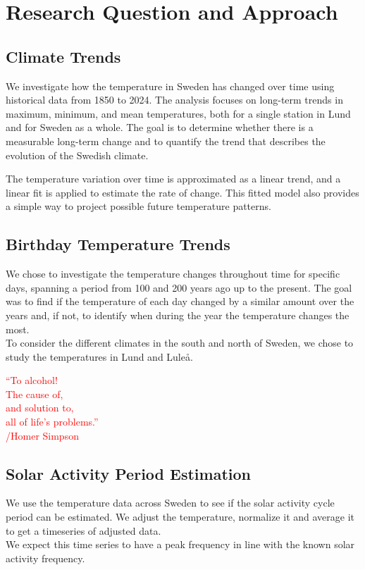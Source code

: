 \section{Research Question and Approach}

\subsection{Climate Trends}

We investigate how the temperature in Sweden has changed over time using historical data from 1850 to 2024. The analysis focuses on long-term trends in maximum, minimum, and mean temperatures, both for a single station in Lund and for Sweden as a whole. The goal is to determine whether there is a measurable long-term change and to quantify the trend that describes the evolution of the Swedish climate.

The temperature variation over time is approximated as a linear trend, and a linear fit is applied to estimate the rate of change. This fitted model also provides a simple way to project possible future temperature patterns.



\subsection{Birthday Temperature Trends}
We chose to investigate the temperature changes throughout time for specific days, spanning a period from 100 and 200 years ago up to the present. The goal was to find if the temperature of each day changed by a similar amount over the years and, if not, to identify when during the year the temperature changes the most. \\

To consider the different climates in the south and north of Sweden, we chose to study the temperatures in Lund and Luleå. 

{\Huge \textcolor{red}{“To alcohol!\\ The cause of,\\ and solution to,\\ all of life’s problems.”}}\\\textcolor{red}{/Homer Simpson}\\


\subsection{Solar Activity Period Estimation}
We use the temperature data across Sweden to see if the solar activity cycle period can be estimated. We adjust the temperature, normalize it and average it to get a timeseries of adjusted data.\\

We expect this time series to have a peak frequency in line with the known solar activity frequency.